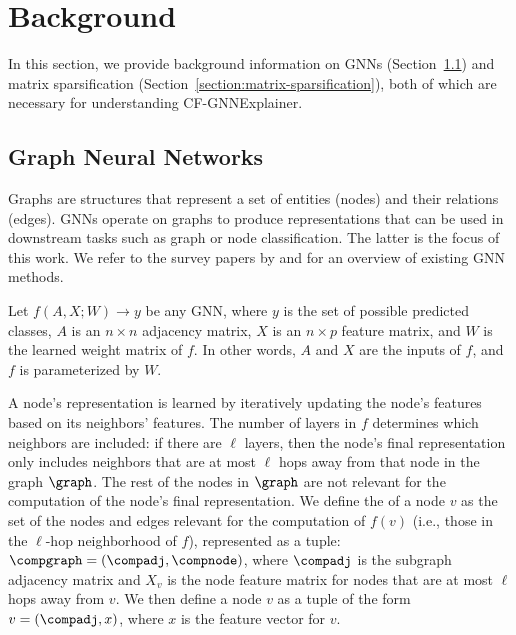 
\section{Background}
\label{section:background}
In this section, we provide background information on GNNs (Section~\ref{section:gnns-general}) and matrix sparsification (Section~\ref{section:matrix-sparsification}), both of which are necessary for understanding CF-GNNExplainer. 

\subsection{Graph Neural Networks}
\label{section:gnns-general}
Graphs are structures that represent a set of entities (nodes) and their relations (edges). 
GNNs operate on graphs to produce representations that can be used in downstream tasks such as graph or node classification. The latter is the focus of this work.
We refer to the survey papers by \citet{battaglia_relational_2018} and \citet{chami2021machine} for an overview of existing GNN methods. 

Let $f(A, X; W) \rightarrow y$ be any GNN, where $y$ is the set of possible predicted classes, $A$ is an $n \times n$ adjacency matrix, $X$ is an $n \times p$ feature matrix, and $W$ is the learned weight matrix of $f$. 
In other words, $A$ and $X$ are the inputs of $f$, and $f$ is parameterized by $W$. 

A node's representation is learned by iteratively updating the node's features based on its neighbors' features.   
The number of layers in $f$ determines which neighbors are included: if there are $\ell$ layers, then the node's final representation only includes neighbors that are at most $\ell$ hops away from that node in the graph $\graph$. 
The rest of the nodes in $\graph$ are not relevant for the computation of the node's final representation.  
We define the \emph{\cgraph{}} of a node $v$ as the set of the nodes and edges relevant for the computation of $f(v)$ (i.e., those in the $\ell$-hop neighborhood of $f$), represented as a tuple: $\compgraph = (\compadj, \compnode)$, where $\compadj$ is the subgraph adjacency matrix and $X_v$ is the node feature matrix for nodes that are at most $\ell$ hops away from $v$. We then define a node $v$ as a tuple of the form $v = (\compadj, x)$, where $x$ is the feature vector for $v$. 

